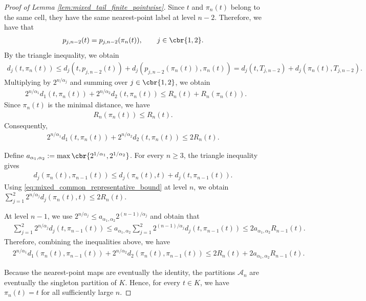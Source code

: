 \documentclass[11pt]{article}
\begin{document}
\begin{proof}[Proof of Lemma
\ref{lem:mixed_tail_finite_pointwise}]
Since $t$ and $\pi_n(t)$ belong to the same cell, they have the same
nearest-point label at level $n-2$. Therefore, we have that
\begin{align*}
p_{j,n-2}(t)
=
p_{j,n-2}(\pi_n(t)),
\qquad j\in\cbr{1,2}.
\end{align*}
By the triangle inequality, we obtain
\begin{align*}
d_j(t,\pi_n(t))\le
d_j(t,p_{j,n-2}(t))
+
d_j(p_{j,n-2}(\pi_n(t)),\pi_n(t))=
d_j(t,T_{j,n-2})
+
d_j(\pi_n(t),T_{j,n-2}).
\end{align*}
Multiplying by $2^{n/\alpha_j}$ and summing over
$j\in\cbr{1,2}$, we obtain
\begin{align*}
&2^{n/\alpha_1}d_1(t,\pi_n(t))
+
2^{n/\alpha_2}d_2(t,\pi_n(t))\le
R_n(t)+R_n(\pi_n(t)).
\end{align*}
Since $\pi_n(t)$ is the minimal distance, we have
\begin{align*}
R_n(\pi_n(t))
\le
R_n(t).
\end{align*}
Consequently,
\begin{align}
2^{n/\alpha_1}d_1(t,\pi_n(t))
+
2^{n/\alpha_2}d_2(t,\pi_n(t))
\le
2R_n(t).
\label{eq:mixed_common_representative_bound}
\end{align}

Define $a_{\alpha_1,\alpha_2}
:=
\max\cbr{2^{1/\alpha_1},2^{1/\alpha_2}}$.
For every $n\ge3$, the triangle inequality gives
\begin{align*}
d_j(\pi_n(t),\pi_{n-1}(t))
\le
d_j(\pi_n(t),t)
+
d_j(t,\pi_{n-1}(t)).
\end{align*}
Using \eqref{eq:mixed_common_representative_bound} at level $n$, we
obtain $\sum_{j=1}^2
2^{n/\alpha_j}d_j(\pi_n(t),t)
\le
2R_n(t)$.

At level $n-1$, we use $2^{n/\alpha_j}
\le
a_{\alpha_1,\alpha_2}
2^{(n-1)/\alpha_j}$
and obtain that
\begin{align*}
&\sum_{j=1}^2
2^{n/\alpha_j}d_j(t,\pi_{n-1}(t))\le
a_{\alpha_1,\alpha_2}
\sum_{j=1}^2
2^{(n-1)/\alpha_j}d_j(t,\pi_{n-1}(t))\le
2a_{\alpha_1,\alpha_2}R_{n-1}(t).
\end{align*}
Therefore, combining the inequalities above, we have
\begin{align}
&2^{n/\alpha_1}
d_1(\pi_n(t),\pi_{n-1}(t))
+
2^{n/\alpha_2}
d_2(\pi_n(t),\pi_{n-1}(t))\le
2R_n(t)
+
2a_{\alpha_1,\alpha_2}R_{n-1}(t).
\label{eq:mixed_common_parent_edge_bound}
\end{align}

Because the nearest-point maps are eventually the identity, the
partitions $\mathcal A_n$ are eventually the singleton partition of
$K$. Hence, for every $t\in K$, we have $\pi_n(t)=t$ for all sufficiently large $n$.


\end{proof}
\end{document}
